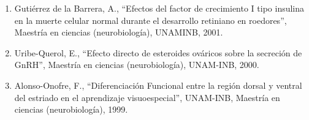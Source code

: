 \begin{enumerate}
\item  Gutiérrez de la Barrera, A., “Efectos del factor de crecimiento I tipo insulina en la muerte celular normal durante el 
desarrollo retiniano en roedores”, Maestría en ciencias (neurobiología), UNAMINB, 2001.

\item  Uribe-Querol, E., “Efecto directo de esteroides ováricos sobre la secreción de GnRH”, Maestría en ciencias 
(neurobiología), 
UNAM-INB, 2000.

\item  Alonso-Onofre, F., “Diferenciación Funcional entre la región dorsal y ventral del estriado en el aprendizaje 
visuoespecial”, UNAM-INB, Maestría en ciencias (neurobiología), 1999.

\end{enumerate}



